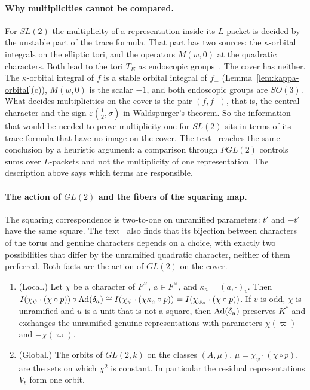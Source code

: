 \paragraph{Why multiplicities cannot be compared.} For $SL(2)$ the
multiplicity of a representation inside its $L$-packet is decided by the
unstable part of the trace formula. That part has two sources: the
$\kappa$-orbital integrals on the elliptic tori, and the operators
$M(w,0)$ at the quadratic characters. Both lead to the tori $T_E$ as
endoscopic groups~\cite{LL79}. The cover has neither. The
$\kappa$-orbital integral of $f$ is a stable orbital integral of $f_-$
(Lemma~\ref{lem:kappa-orbital}(c)), $M(w,0)$ is the scalar $-1$, and
both endoscopic groups are $SO(3)$. What decides multiplicities on the
cover is the pair $(f,f_-)$, that is, the central character and the
sign $\varepsilon(\frac12,\sigma)$ in Waldspurger's theorem. So the
information that would be needed to prove multiplicity one for $SL(2)$
sits in terms of its trace formula that have no image on the cover.
The text~\cite{JC26} reaches the same conclusion by a heuristic
argument: a comparison through $PGL(2)$ controls sums over $L$-packets
and not the multiplicity of one representation. The description above
says which terms are responsible.

\paragraph{The action of $GL(2)$ and the fibers of the squaring map.}
The squaring correspondence is two-to-one on unramified parameters:
$t'$ and $-t'$ have the same square. The text~\cite{JC26} also finds
that its bijection between characters of the torus and genuine
characters depends on a choice, with exactly two possibilities that
differ by the unramified quadratic character, neither of them
preferred. Both facts are the action of $GL(2)$ on the cover.

\begin{proposition}\label{prop:fibers}
\begin{enumerate}[label=(\alph*)]
\item (Local.) Let $\chi$ be a character of $F^\times$, $a\in F^\times$,
  and $\kappa_a=(a,\cdot)_v$. Then $I(\chi_{\psi}\cdot(\chi\circ p))\circ
  \operatorname{Ad}(\delta_a)\cong I(\chi_\psi\cdot(\chi\kappa_a\circ p))=I(
  \chi_{\psi_a}\cdot(\chi\circ p))$. If $v$ is odd, $\chi$ is unramified
  and $u$ is a unit that is not a square, then $\operatorname{Ad}(\delta_u)$ preserves
  $K^*$ and exchanges the unramified genuine representations with
  parameters $\chi(\varpi)$ and $-\chi(\varpi)$.
\item (Global.) The orbits of $GL(2,k)$ on the classes $(A,\mu)$,
  $\mu=\chi_\psi\cdot(\chi\circ p)$, are the sets on which $\chi^2$ is
  constant. In particular the residual representations $V_b$ form one
  orbit.
\end{enumerate}
\end{proposition}


